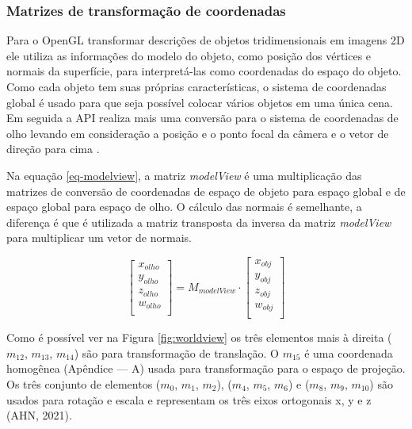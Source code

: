 \subsubsection{Matrizes de transformação de coordenadas}
\label{sec:matrizes-transformacao-coordenadas}

Para o OpenGL transformar descrições de objetos tridimensionais em imagens 2D ele utiliza as informações do modelo do objeto, como posição dos vértices e normais da superfície, para interpretá-las como coordenadas do espaço do objeto. Como cada objeto tem suas próprias características, o sistema de coordenadas global é usado para que seja possível colocar vários objetos em uma única cena. Em seguida a API realiza mais uma conversão para o sistema de coordenadas de olho levando em consideração a posição e o ponto focal da câmera e o vetor de direção para cima \cite{GLSLBook}. 

Na equação \ref{eq-modelview}, a matriz \textit{modelView} é uma multiplicação das matrizes de conversão de coordenadas de espaço de objeto para espaço global e de espaço global para espaço de olho. O cálculo das normais é semelhante, a diferença é que é utilizada a matriz transposta da inversa da matriz \textit{modelView} para multiplicar um vetor de normais. 

\begin{equation} \label{eq-modelview} \tag{2}
	\begin{bmatrix}
		x_{olho} \\
		y_{olho} \\
		z_{olho} \\
		w_{olho} \\
	\end{bmatrix}
	=
	M_{modelView} \cdot
	\begin{bmatrix}
		x_{obj} \\
		y_{obj} \\
		z_{obj} \\
		w_{obj} \\
	\end{bmatrix}
\end{equation}

Como é possível ver na Figura \ref{fig:worldview} os três elementos mais à direita ($ m_{12} $, $ m_{13} $, $ m_{14} $) são para transformação de translação. O $ m_{15} $ é uma coordenada homogênea (Apêndice --- A) usada para transformação para o espaço de projeção. Os três conjunto de elementos ($ m_{0} $, $ m_{1} $, $ m_{2} $), ($ m_{4} $, $ m_{5} $, $ m_{6} $) e ($ m_{8} $, $ m_{9} $, $ m_{10} $) são usados para rotação e escala e representam os três eixos ortogonais x, y e z (AHN, 2021)\nocite{openglOnline}.

